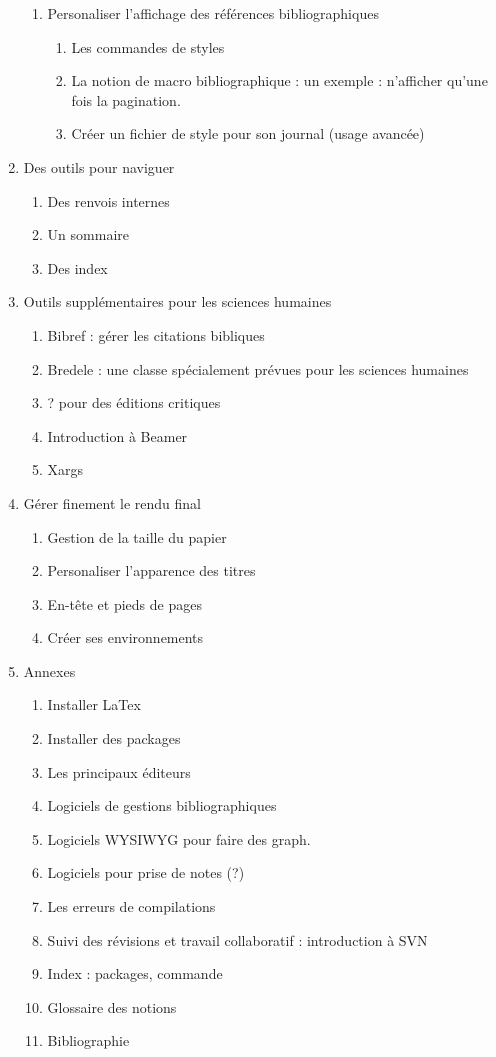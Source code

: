 \begin{enumerate}
\begin{enumerate}
\item Personaliser l'affichage des références bibliographiques
	\begin{enumerate}
	\item Les commandes de styles
	\item La notion de macro bibliographique : un exemple : n'afficher qu'une fois la pagination.
	\item Créer un fichier de style pour son journal (usage avancée)
	\end{enumerate}	
\end{enumerate}

\item Des outils pour naviguer
\begin{enumerate}
\item Des renvois internes
\item Un sommaire
\item Des index
\end{enumerate}

\item Outils supplémentaires pour les sciences humaines
\begin{enumerate}
\item Bibref : gérer les citations bibliques
\item Bredele : une classe spécialement prévues pour les sciences humaines
\item ? pour des éditions critiques
\item Introduction à Beamer
\item Xargs
\end{enumerate}

\item Gérer finement le rendu final
\begin{enumerate}
\item Gestion de la taille du papier
\item Personaliser l'apparence des titres
\item En-tête et pieds de pages
\item Créer ses environnements
\end{enumerate}

\item{Annexes}
\begin{enumerate}
\item Installer LaTex
\item Installer des packages
\item Les principaux éditeurs
\item Logiciels de gestions bibliographiques
\item Logiciels WYSIWYG pour faire des graph.
\item Logiciels pour prise de notes (?)
\item Les erreurs de compilations
\item Suivi des révisions et travail collaboratif : introduction à SVN
\item Index : packages, commande
\item Glossaire des notions
\item Bibliographie
\end{enumerate}
\end{enumerate}